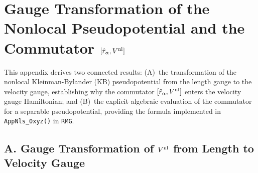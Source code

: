 
\section{Gauge Transformation of the Nonlocal Pseudopotential
  and the Commutator $[\hat{r}_\alpha, V^{\mathrm{nl}}]$}
\label{app:gauge_nlpp}

This appendix derives two connected results:
(A)~the transformation of the nonlocal Kleinman-Bylander (KB)
pseudopotential from the length gauge to the velocity gauge,
establishing why the commutator $[\hat{r}_\alpha, V^{\mathrm{nl}}]$ enters the
velocity gauge Hamiltonian; and (B)~the explicit algebraic evaluation
of the commutator for a separable pseudopotential, providing the
formula implemented in \texttt{AppNls\_0xyz()} in \texttt{RMG}.

\subsection*{A.\; Gauge Transformation of $V^{\mathrm{nl}}$ from Length to
  Velocity Gauge}
\label{app:gauge-transform-Vnl}

